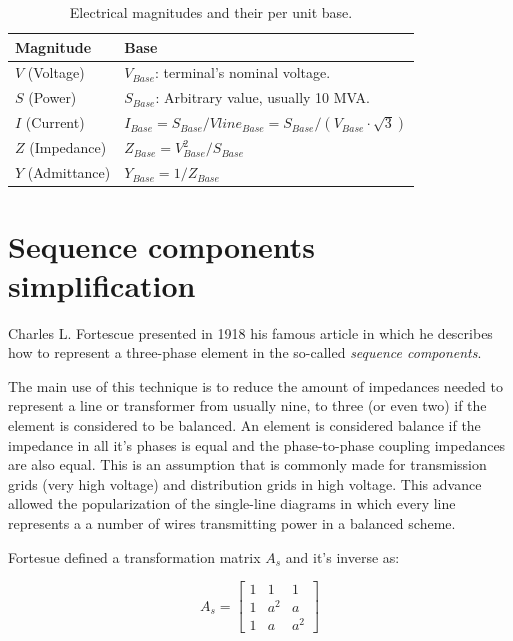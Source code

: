 \documentclass[nols,a4paper,twoside,symmetric,notoc,fleqn]{tufte-book}
\begin{document}
\bigskip
\begin{table}[h!]
\begin{center}
\footnotesize
\begin{tabularx}{\textwidth}{lX}
\toprule
Magnitude &  Base\\
\midrule
$V$ (Voltage) & $V_{Base}$: terminal's nominal voltage. \\
$S$ (Power) & $S_{Base}$: Arbitrary value, usually 10 MVA. \\
$I$ (Current) & $I_{Base} = S_{Base} / Vline_{Base} = S_{Base} / (V_{Base} \cdot \sqrt{3})$ \\
$Z$ (Impedance) & $Z_{Base} = V_{Base}^2 / S_{Base}$ \\
$Y$ (Admittance) & $Y_{Base} = 1 / Z_{Base}$ \\
\bottomrule
\end{tabularx}
\end{center}
  \caption{Electrical magnitudes and their per unit base.}
  \label{magnitudes_and_their_base}
\end{table}


\section{Sequence components simplification}

Charles L. Fortescue presented in 1918 his famous article \cite{fortescue1918method} in which he describes how to represent a three-phase element in the so-called \textit{sequence components}.

The main use of this technique is to reduce the amount of impedances needed to represent a line or transformer from usually nine, to three (or even two) if the element is considered to be balanced. An element is considered balance if the impedance in all it's phases is equal and the phase-to-phase coupling impedances are also equal. This is an assumption that is commonly made for transmission grids (very high voltage) and distribution grids in high voltage. This advance allowed the popularization of the single-line diagrams in which every line represents a  a number of wires transmitting power in a balanced scheme.

Fortesue defined a transformation matrix $A_s$ and it's inverse as:

\begin{equation}
A_s = \left[ \begin{array}{ccc}
1 & 1 & 1 \\
1 & a^2 & a \\
1 & a & a^2
\end{array} \right]
\end{equation}
\end{document}
